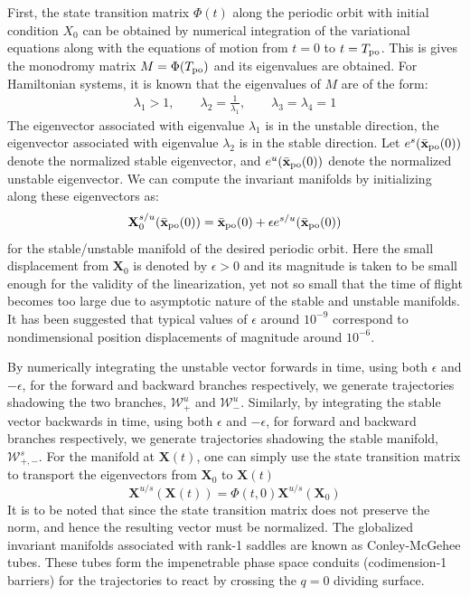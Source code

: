 \documentclass{ws-ijbc}
\begin{document}
First, the state transition matrix $\Phi(t)$ along the periodic orbit with initial condition $X_0$ can be obtained by numerical integration of the variational equations 
along with the equations of motion from $t = 0$ to $t = T_{\rm po}$. This is gives the monodromy matrix $M = \Phi(T_{\rm po})$ and its eigenvalues are obtained. For Hamiltonian systems\cite{Meyer2009}, it is known that the eigenvalues of $M$ are of the form:
\begin{align}
\lambda_1 > 1, \qquad \lambda_2 = \frac{1}{\lambda_1}, \qquad \lambda_3 = 
\lambda_4 = 1
\end{align}
The eigenvector associated with eigenvalue $\lambda_1$ is in the unstable 
direction, the eigenvector associated with eigenvalue $\lambda_2$ is in the stable 
direction. Let $e^{s}(\bar{\mathbf{x}}_{\rm po}(0))$ denote the normalized stable eigenvector, and $e^{u}(\bar{\mathbf{x}}_{\rm po}(0))$ 
denote the normalized unstable eigenvector. We can compute the invariant manifolds by 
initializing along these eigenvectors as:
% 
\begin{equation}
\mathbf{X}_0^{s/u}(\bar{\mathbf{x}}_{\rm po}(0)) = \bar{\mathbf{x}}_{\rm po}(0) + \epsilon e^{s/u}(\bar{\mathbf{x}}_{\rm po}(0))
\end{equation}
%
for the stable/unstable manifold of the desired periodic orbit. Here the small displacement from $\mathbf{X}_0$ is denoted by $\epsilon > 0$ and its magnitude is taken to be small enough for the validity of the linearization, yet not so small that the time of flight becomes too large due to asymptotic nature of the stable and unstable manifolds. It has been suggested\cite{Koon2011} that typical values of $\epsilon$ around $10^{-9}$ correspond to nondimensional position displacements of magnitude around $10^{-6}$.

By numerically integrating the unstable vector forwards in time, using both 
$\epsilon$ and $-\epsilon$, for the forward and backward branches respectively, we 
generate trajectories shadowing the two branches, $\mathcal{W}^u_{+}$ and $\mathcal{W}^u_{-}$. Similarly, by integrating the stable vector backwards in time, using both $\epsilon$ and $-\epsilon$, for forward and backward branches respectively, we generate trajectories shadowing the stable manifold, $\mathcal{W}^{s}_{+,-}$. 
For the manifold at $\mathbf{X}(t)$, one can simply use the state transition matrix to 
transport the eigenvectors from $\mathbf{X}_0$ to $\mathbf{X}(t)$
% 
\begin{equation}
\mathbf{X}^{u/s}(\mathbf{X}(t)) = \Phi(t,0)\mathbf{X}^{u/s}(\mathbf{X}_0)
\end{equation}
%
It is to be noted that since the state transition matrix does not preserve the norm, and hence the resulting vector must be normalized. The globalized invariant manifolds associated with rank-1 saddles are known as Conley-McGehee tubes\cite{Marsden2006}. These tubes form the impenetrable phase space conduits (codimension-1 barriers) for the trajectories to react by crossing the $q = 0$ dividing surface.
\end{document}
